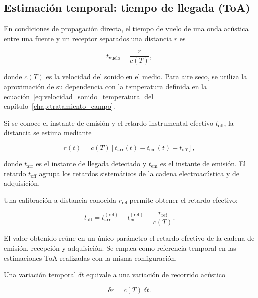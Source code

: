 \subsection{Estimación temporal: tiempo de llegada (ToA)}

En condiciones de propagación directa, el tiempo de vuelo de una onda
acústica entre una fuente y un receptor separados una distancia $r$ es

\begin{equation}
    t_{\mathrm{vuelo}} = \frac{r}{c(T)},
    \label{eq:tiempo_vuelo}
\end{equation}

donde $c(T)$ es la velocidad del sonido en el medio. Para aire seco,
se utiliza la aproximación de su dependencia con la temperatura definida
en la ecuación~\eqref{eq:velocidad_sonido_temperatura} del
capítulo~\ref{chap:tratamiento_campo}.

Si se conoce el instante de emisión y el retardo instrumental efectivo
$t_{\mathrm{off}}$, la distancia se estima mediante

\begin{equation}
    r(t) = c(T)\left[
    t_{\mathrm{arr}}(t)-t_{\mathrm{em}}(t)-t_{\mathrm{off}}
    \right],
    \label{eq:distancia_toa_absoluta}
\end{equation}

donde $t_{\mathrm{arr}}$ es el instante de llegada detectado y
$t_{\mathrm{em}}$ es el instante de emisión. El retardo $t_{\mathrm{off}}$
agrupa los retardos sistemáticos de la cadena electroacústica y de
adquisición.

Una calibración a distancia conocida $r_{\mathrm{ref}}$ permite obtener
el retardo efectivo:

\begin{equation}
    t_{\mathrm{off}} =
    t_{\mathrm{arr}}^{(\mathrm{ref})}
    -t_{\mathrm{em}}^{(\mathrm{ref})}
    -\frac{r_{\mathrm{ref}}}{c(T)}.
    \label{eq:calibracion_toffset}
\end{equation}

El valor obtenido reúne en un único parámetro el retardo efectivo de
la cadena de emisión, recepción y adquisición. Se emplea como referencia
temporal en las estimaciones ToA realizadas con la misma configuración.

Una variación temporal $\delta t$ equivale a una variación de recorrido
acústico

\begin{equation}
    \delta r = c(T)\,\delta t.
    \label{eq:conversion_resolucion_toa}
\end{equation}

